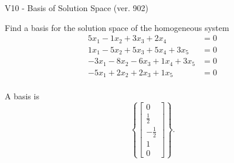 \begin{exercise}
  \begin{exerciseTitle}V10 - Basis of Solution Space (ver. 902)\end{exerciseTitle}
  \begin{exerciseStatement}
    Find a basis for the solution space of the homogeneous system 
\begin{align*}
 5 x_ 1 -1 x_ 2 + 3 x_ 3 + 2 x_ 4 &= 0  \\ 
  1 x_ 1 -5 x_ 2 + 5 x_ 3 + 5 x_ 4 + 3 x_ 5 &= 0  \\ 
  -3 x_ 1 -8 x_ 2 -6 x_ 3 + 1 x_ 4 + 3 x_ 5 &= 0  \\ 
  -5 x_ 1 + 2 x_ 2 + 2 x_ 3 + 1 x_ 5 &= 0  \\ 
 \end{align*}


 
  \end{exerciseStatement}

  \begin{exerciseAnswer}
   A basis is   
\[\left\{\left[\begin{array}{c}
0 \\
\frac{1}{2} \\
-\frac{1}{2} \\
1 \\
0
\end{array}\right]\right\}.\]

  


  \end{exerciseAnswer}
\end{exercise}